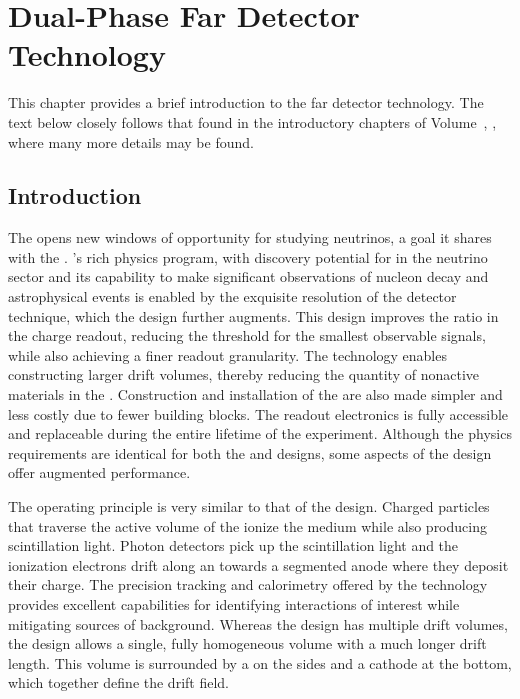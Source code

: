 \chapter{Dual-Phase Far Detector Technology}
\label{ch:exec-dp}

This chapter provides a brief introduction to the  far detector technology.  The text below closely follows that found in the introductory chapters of Volume~\volnumberdp{}, \voltitledp{}, where many more details may be found.

\section{Introduction}
\label{sec:dp-execsum-introduction}



The    opens new windows of opportunity for studying neutrinos, a goal it shares with the .  
%
 's rich physics program, with discovery potential for  in the neutrino sector and its capability to make significant observations of nucleon decay and astrophysical events is enabled by the exquisite resolution of the  detector technique, which the  design further augments. This design improves the  ratio in the charge readout, reducing the threshold for the smallest observable signals, while also achieving a finer readout granularity.  The  technology enables constructing larger drift volumes, thereby reducing  the quantity of nonactive materials in the . Construction and installation of the  are also made simpler and less costly due to fewer building blocks. The readout electronics is fully accessible and replaceable during the entire lifetime of the experiment. Although the physics requirements are identical for both the  and  designs, some aspects of the  design offer augmented performance. 

The operating principle is very similar to that of the  design.  Charged particles that traverse the active volume of the  ionize the medium while also producing scintillation light.  Photon detectors pick up the scintillation light and the ionization electrons drift along an \efield towards a segmented anode where they deposit their charge. The precision tracking and calorimetry offered by the  technology provides excellent capabilities for identifying interactions of interest while mitigating sources of background.  Whereas the  design has multiple drift volumes, the  design allows a single, fully homogeneous  volume with a much longer drift length. This volume is surrounded by a  on the sides and a cathode at the bottom, which together define the drift field. 

